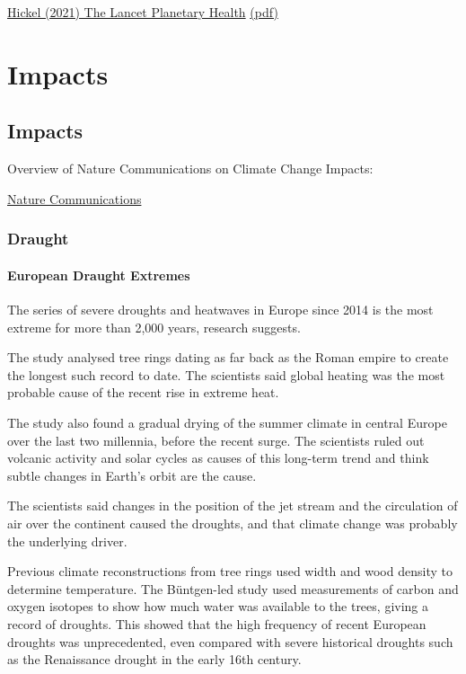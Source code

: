 \documentclass[
]{book}
\begin{document}
\href{https://www.thelancet.com/journals/lanplh/article/PIIS2542-5196(20)30196-0/fulltext}{Hickel (2021) The Lancet Planetary Health}
\href{pdf/Hickel_2021_Fair_Shares.pdf}{(pdf)}

\hypertarget{part-impacts}{%
\part{Impacts}\label{part-impacts}}

\hypertarget{impacts}{%
\chapter{Impacts}\label{impacts}}

Overview of Nature Communications on Climate Change Impacts:

\href{https://www.nature.com/collections/hcfhgcahdc}{Nature Communications}

\hypertarget{draught}{%
\section{Draught}\label{draught}}

\hypertarget{european-draught-extremes}{%
\subsection{European Draught Extremes}\label{european-draught-extremes}}

The series of severe droughts and heatwaves in Europe since 2014 is the most extreme for more than 2,000 years, research suggests.

The study analysed tree rings dating as far back as the Roman empire to create the longest such record to date. The scientists said global heating was the most probable cause of the recent rise in extreme heat.

The study also found a gradual drying of the summer climate in central Europe over the last two millennia, before the recent surge. The scientists ruled out volcanic activity and solar cycles as causes of this long-term trend and think subtle changes in Earth's orbit are the cause.

The scientists said changes in the position of the jet stream and the circulation of air over the continent caused the droughts, and that climate change was probably the underlying driver.

Previous climate reconstructions from tree rings used width and wood density to determine temperature. The Büntgen-led study used measurements of carbon and oxygen isotopes to show how much water was available to the trees, giving a record of droughts. This showed that the high frequency of recent European droughts was unprecedented, even compared with severe historical droughts such as the Renaissance drought in the early 16th century.
\end{document}
